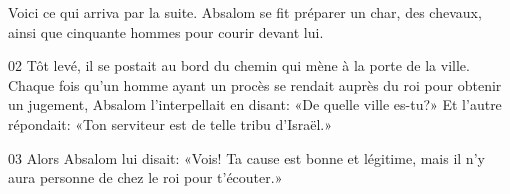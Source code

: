 Voici ce qui arriva par la suite. Absalom se fit préparer un char, des chevaux, ainsi que cinquante hommes pour courir devant lui.

02 Tôt levé, il se postait au bord du chemin qui mène à la porte de la ville. Chaque fois qu’un homme ayant un procès se rendait auprès du roi pour obtenir un jugement, Absalom l’interpellait en disant: «De quelle ville es-tu?» Et l’autre répondait: «Ton serviteur est de telle tribu d’Israël.»

03 Alors Absalom lui disait: «Vois! Ta cause est bonne et légitime, mais il n’y aura personne de chez le roi pour t’écouter.»
